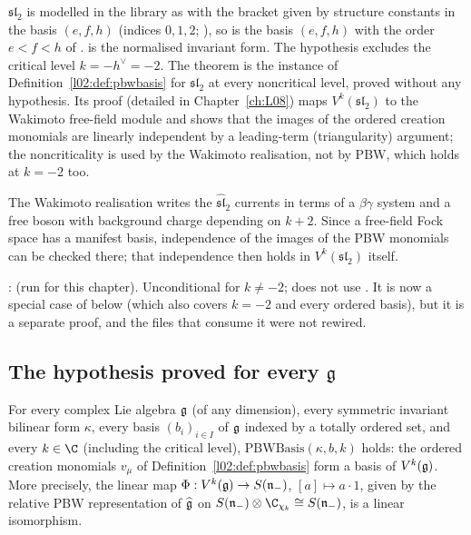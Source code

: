 \begin{dictionary}
$\mathfrak{sl}_2$ is modelled in the library as  with the bracket given by structure
constants in the basis $(e,f,h)$ (indices $0,1,2$; ), so
 is the basis $(e,f,h)$ with the order $e<f<h$ of .
 is the normalised invariant form. The hypothesis  excludes the
critical level $k = -h^\vee = -2$. The theorem is the instance of Definition~\ref{l02:def:pbwbasis} for
$\mathfrak{sl}_2$ at every noncritical level, proved without any hypothesis. Its proof (detailed in
Chapter~\ref{ch:L08}) maps $V^k(\mathfrak{sl}_2)$ to the Wakimoto free-field module and shows that the images
of the ordered creation monomials are linearly independent by a leading-term (triangularity) argument;
the noncriticality is used by the Wakimoto realisation, not by PBW, which holds at $k=-2$ too.
\end{dictionary}

\begin{physics}
The Wakimoto realisation writes the $\widehat{\mathfrak{sl}}_2$ currents in terms of a $\beta\gamma$ system and
a free boson with background charge depending on $k+2$. Since a free-field Fock space has a manifest
basis, independence of the images of the PBW monomials can be checked there; that independence then
holds in $V^k(\mathfrak{sl}_2)$ itself.
\end{physics}

\begin{status}
\allowbreak{}\allowbreak{}\allowbreak{}\allowbreak{}\allowbreak{}:  (run for this chapter). Unconditional for $k\ne-2$; does not use . It is now a
special case of  below (which also covers $k = -2$ and every ordered basis), but it
is a separate proof, and the files that consume it were not rewired.
\end{status}

\subsection{The hypothesis proved for every \texorpdfstring{$\mathfrak g$}{g}}\label{l02:sec:pbwbasisholds}

\begin{theorem}\label{l02:thm:pbwbasisholds}
For every complex Lie algebra $\mathfrak{g}$ (of any dimension), every symmetric invariant bilinear form $\kappa$,
every basis $(b_i)_{i\in I}$ of $\mathfrak{g}$ indexed by a totally ordered set, and every $k\in\C$ (including the
critical level), $\mathrm{PBWBasis}(\kappa,b,k)$ holds: the ordered creation monomials $v_\mu$ of
Definition~\ref{l02:def:pbwbasis} form a basis of $V^k(\mathfrak{g})$. More precisely, the linear map
$\Phi : V^k(\mathfrak{g})\to S(\mathfrak{n}_-)$, $[a]\mapsto a\cdot1$, given by the relative PBW representation of
$\widehat{\mathfrak{g}}$ on $S(\ltwon_-)\otimes\C_{\chi_k}\cong S(\ltwon_-)$, is a linear isomorphism.
\end{theorem}

